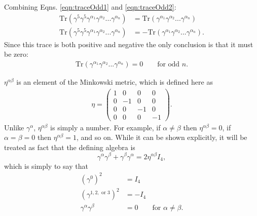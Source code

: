 Combining Eqns. \ref{eqn:traceOdd1} and \ref{eqn:traceOdd2}:
\begin{align*}
\text{Tr}(\gamma^5 \gamma^5 \gamma^{\alpha_1} \gamma^{\alpha_2} ...
\gamma^{\alpha_n})&=\text{Tr}(\gamma^{\alpha_1} \gamma^{\alpha_2} ...
\gamma^{\alpha_n})
\\
\text{Tr}(\gamma^5 \gamma^5 \gamma^{\alpha_1} \gamma^{\alpha_2} ...
\gamma^{\alpha_n})&=-\text{Tr}(\gamma^{\alpha_1} \gamma^{\alpha_2} ...
\gamma^{\alpha_n}).
\end{align*}
Since this trace is both positive and negative the only conclusion is that it
must be zero:
\begin{align}\label{eqn:griffithsRule10}
\text{Tr}(\gamma^{\alpha_1} \gamma^{\alpha_2} ... \gamma^{\alpha_n})=0 \qquad \text{for
odd $n$.}
\end{align}

\label{ssc:griffithsRule12}

$\eta^{\alpha\beta}$ is an element of the Minkowski metric, which is defined here as
\begin{align*}
\eta=
\begin{pmatrix}
1 & 0 & 0 & 0 \\
0 & -1 & 0 & 0\\
0 & 0 & -1 & 0\\
0 & 0 & 0 & -1
\end{pmatrix}.
\end{align*}
Unlike $\gamma^\alpha$, $\eta^{\alpha\beta}$ is simply a number. For example, if
$\alpha\neq\beta$
then $\eta^{\alpha\beta}=0$, if $\alpha=\beta=0$ then $\eta^{\alpha\beta}=1$, and so
on. While it can be
shown explicitly, it will be treated as fact that the defining algebra is
\begin{equation}\label{eqn:cliffordAlgebra}
\gamma^\alpha\gamma^\beta + \gamma^\beta \gamma^\alpha=2\eta^{\alpha\beta}I_4,
\end{equation}
which is simply to say that 
\begin{align*}
(\gamma^0)^2&=I_4\\
(\gamma^{1,2, \text{ or }3})^2&=-I_4\\
\gamma^\alpha\gamma^\beta&=0 \qquad \text{for }\alpha\neq\beta.
\end{align*}


